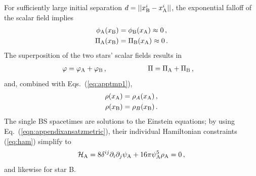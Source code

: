 \documentclass[]{iopart}
\begin{document}
For sufficiently large initial separation $d=||x_{\rm B}^i -x_{\rm
A}^i||$, the exponential falloff of the scalar field implies
%
\begin{equation}
\begin{aligned}
    \phi_{\rm A}(x_{\rm B}) &= \phi_{\rm B}(x_{\rm A}) \approx 0\,, \\
     \Pi_{\rm A}(x_{\rm B}) &= \Pi_{\rm B}(x_{\rm A}) \approx 0\,.
\end{aligned}
\label{eq:apptmp1}
\end{equation}
%
The superposition of the two stars' scalar fields results in
%
\begin{align}
  &\varphi = \varphi_{\rm A} + \varphi_{\rm B}\,,
  \hspace{0.85cm}~~~~~~~~~~
  \Pi = \Pi_{\rm A} + \Pi_{\rm B}\,,
\end{align}
%
and, combined with Eqs.~(\ref{eq:apptmp1}),
%
\begin{equation}
\begin{aligned}
  \rho(x_{\rm A}) &= \rho_A(x_{\rm A})\,, \\
  \rho(x_{\rm B}) &= \rho_B(x_{\rm B})\,.
\end{aligned}\label{eqn:energydensityconditon}
\end{equation}
%
The single BS spacetimes are solutions to the Einstein equations;
by using Eq.~(\ref{eqn:appendixansatzmetric}), their individual
Hamiltonian constraints (\ref{eq:ham}) simplify to
%
\begin{equation}
    \mathcal{H}_{\rm A} = 8 \delta^{ij} \partial_i\partial_j
    \psi_{\rm A} +  16\pi \psi_{\rm A}^5\rho_{\rm A} = 0\,,
    \label{eq:hamA}
\end{equation}
%
and likewise for star B.
\end{document}
